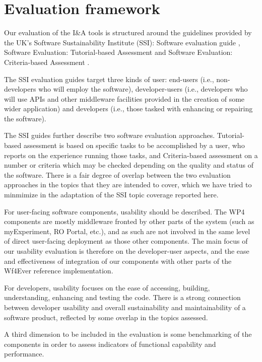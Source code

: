 \section{Evaluation framework}

Our evaluation of the I\&A tools is structured around the guidelines
provided by the UK's Software Sustainability Institute (SSI): Software
evaluation guide \cite{SSI-guide}, Software Evaluation: Tutorial-based
Assessment \cite{SSI-tutorial} and Software Evaluation: Criteria-based
Assessment \cite{SSI-criteria}.

The SSI evaluation guides target three kinds of user: end-users (i.e.,
non-developers who will employ the software), developer-users (i.e.,
developers who will use APIs and other middleware facilities provided in
the creation of some wider application) and developers (i.e., those
tasked with enhancing or repairing the software).

The SSI guides further describe two software evaluation approaches.
Tutorial-based assessment is based on specific tasks to be accomplished
by a user, who reports on the experience running those tasks, and
Criteria-based assessment on a number or criteria which may be checked
depending on the quality and status of the software. There is a fair
degree of overlap between the two evaluation approaches in the topics
that they are intended to cover, which we have tried to minmimize in the
adaptation of the SSI topic coverage reported here.

For user-facing software components, usability should be described. The
WP4 components are mostly middleware fronted by other parts of the
system (such as myExperiment, RO Portal, etc.), and as such are not
involved in the same level of direct user-facing deployment as those
other components. The main focus of our usability evaluation is
therefore on the developer-user aspects, and the ease and effectiveness
of integration of our components with other parts of the Wf4Ever
reference implementation.

For developers, usability focuses on the ease of accessing, building,
understanding, enhancing and testing the code. There is a strong
connection between developer usability and overall sustainability and
maintainability of a software product, reflected by some overlap in the
topics assessed.

A third dimension to be included in the evaluation is some benchmarking
of the components in order to assess indicators of functional capability
and performance.

